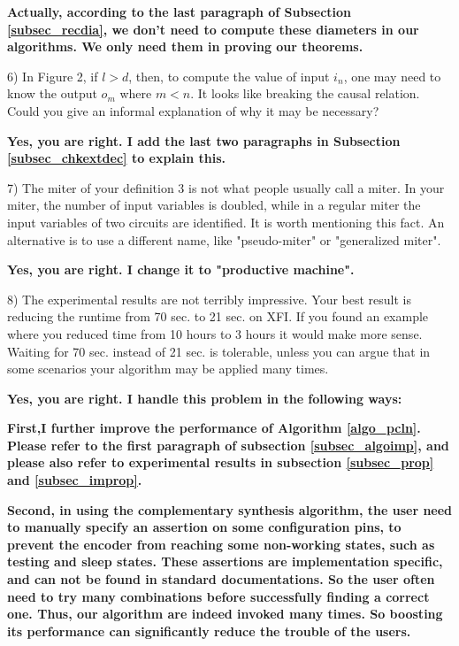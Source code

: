 \documentclass[journal]{IEEEtran}
\begin{document}
\smallskip

\textbf{Actually,
according to the last paragraph of Subsection \ref{subsec_recdia},
we don't need to compute these diameters in our algorithms.
We only need them in proving our theorems.}

\bigskip


6) In Figure 2, if  $l > d$, then, to compute the value of  input $i_n$, one may need to know the output $o_m$ where $m < n$.
It looks like breaking the causal relation.
  Could you give an informal explanation of why it may be necessary?

\smallskip

\textbf{Yes,
you are right.
I add the last two paragraphs in Subsection \ref{subsec_chkextdec} to explain this.}


\bigskip

7)  The miter of your definition 3 is not what people usually call a miter. In your miter,
the number of input variables is doubled, while in a regular miter the input
variables of two circuits are identified. It is worth mentioning this fact.
An alternative is  to use a different name, like "pseudo-miter" or "generalized miter".

\smallskip

\textbf{Yes,
you are right.
I change it to "productive machine".}

\bigskip


8) The experimental results are not terribly impressive. Your best result is reducing the runtime from 70 sec. to 21 sec. on XFI.
  If you found an example where you reduced time from 10 hours to 3 hours it would make more sense.
Waiting for 70 sec. instead of 21 sec. is tolerable,
  unless you can argue that in some scenarios your algorithm may be applied many times.

\smallskip

\textbf{Yes,
you are right.
I handle this problem in the following ways:}

\textbf{
First,I further improve the performance of Algorithm \ref{algo_pcln}.
Please refer to the first paragraph of subsection \ref{subsec_algoimp},
and please also refer to experimental results in subsection \ref{subsec_prop} and \ref{subsec_improp}.}

\textbf{
Second,
in using the complementary synthesis algorithm,
the  user need to manually specify an assertion on some configuration pins,
to prevent the encoder from reaching some non-working states,
such as testing and sleep states.
These assertions are implementation specific,
and can not be found in standard documentations.
So the user often need to try many combinations before successfully finding a correct one.
Thus,
our algorithm are indeed invoked many times.
So boosting its performance can significantly reduce the trouble of the users.
}
\end{document}
